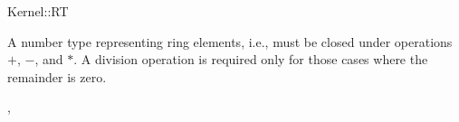 \begin{ccRefConcept}{Kernel::RT}

A number type representing ring elements, i.e., must be closed under
operations $+$, $-$, and $*$. A division operation is required only
for those cases where the remainder is zero.

\ccRefines
{}, \\ 
\end{ccRefConcept}
